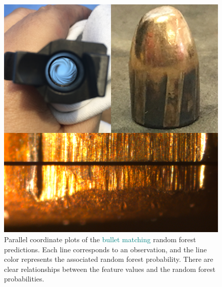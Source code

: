 \documentclass[AMS,STIX2COL]{WileyNJD-v2}\usepackage[]{graphicx}\usepackage[]{color}
\newenvironment{knitrout}{}{} %
\newcommand{\kge}[1]{\textcolor{teal}{#1}}
\renewcommand{\sout}[1]{\unskip}
\begin{document}
\begin{figure}[!thp]
\begin{knitrout}
\color{fgcolor}

{\centering \includegraphics[width=6.5in]{figure-static/figure-08-1} 

}



\end{knitrout}
\caption{Parallel coordinate plots of the \kge{bullet matching} \sout{\citet{hare:2017}} random forest predictions\sout{from the training (top \kge{row}\sout{facet}) and testing (bottom \kge{row}\sout{facet}) data}. \sout{The observations are separated by known matching (right column) and non-matching (left column) signatures. The y-axis shows the standardized feature values, and the x-axis shows the features used to fit the random forest (ordered by random forest impurity based feature importance).} Each line corresponds to an observation, and the line color represents the associated random forest probability. There are clear relationships between the feature values and the random forest probabilities.}
\label{fig:figure-08}
\end{figure}
\end{document}
